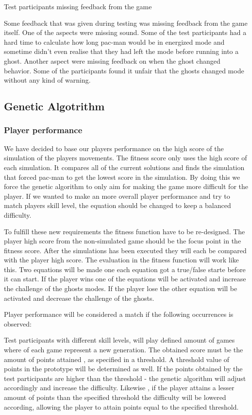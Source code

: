 Test participants missing feedback from the game

Some feedback that was given during testing was missing feedback from the game itself. One of the aspects were missing sound. Some of the test participants had a hard time to calculate how long pac-man would be in energized mode and sometime didn’t even realise that they had left the mode before running into a ghost. Another aspect were missing feedback on when the ghost changed behavior. Some of the participants found it unfair that the ghosts changed mode without any kind of warning.



\subsection{Genetic Algotrithm}

\subsubsection{Player performance}

We have decided to base our players performance on the high score of the simulation of the players movements. The fitness score only uses the high score of each simulation. It compares all of the current solutions and finds the simulation that forced pac-man to get the lowest score in the simulation. By doing this we force the genetic algorithm to only aim for making the game more difficult for the player. If we wanted to make an more overall player performance and try to match players skill level, the equation should be changed to keep a balanced difficulty.

To fulfill these new requirements the fitness function have to be re-designed. The player high score from the non-simulated game should be the focus point in the fitness score. After the simulations has been executed they will each be compared with the player high score. The evaluation in the fitness function will work like this. Two equations will be made one each equation got a true/false starte before it can start. If the player wins one of the equations will be activated and increase the challenge of the ghosts modes. If the player lose the other equation will be activated and decrease the challenge of the ghosts.

Player performance will be considered a match if the following occurrences is observed:

Test participants with different skill levels, will play defined amount of games where of each game represent a new generation. The obtained score must be the amount of points attained , as specified in a threshold. A threshold value of points in the prototype will be determined as well.
If the points obtained by the test participants are higher than the threshold - the genetic algorithm will adjust accordingly and increase the difficulty. Likewise , if the player attains a lesser amount of points than the specified threshold the difficulty will be lowered according, allowing the player to attain points equal to the specified threshold.

